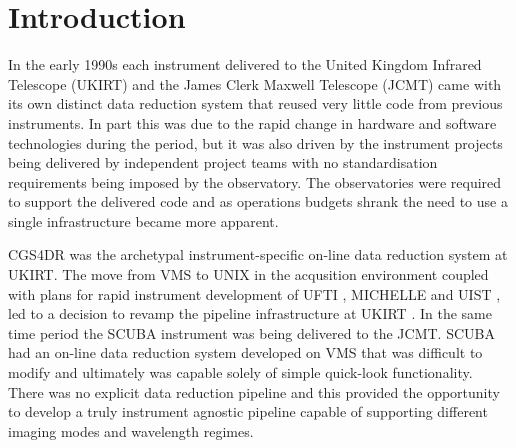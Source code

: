 \documentclass[final,authoryear,5p,times,twocolumn]{elsarticle}
\begin{document}

\newcommand{\mnras}{MNRAS}
\newcommand{\aap}{A\&A}
\newcommand{\aaps}{A\&AS}
\newcommand{\pasp}{PASP}
\newcommand{\apj}{ApJ}
\newcommand{\apjs}{ApJS}
\newcommand{\qjras}{QJRAS}
\newcommand{\an}{Astron.\ Nach.}
\newcommand{\ijimw}{Int.\ J.\ Infrared \& Millimeter Waves}
\newcommand{\procspie}{Proc.\ SPIE}
\newcommand{\aspconf}{ASP Conf. Ser.}


\newcommand{\recipe}{\emph{Recipe}}
\newcommand{\recipes}{\emph{Recipes}}
\newcommand{\primitive}{\emph{Primitive}}
\newcommand{\primitives}{\emph{Primitives}}
\newcommand{\Frame}{\emph{Frame}}
\newcommand{\Group}{\emph{Group}}
\newcommand{\Index}{\emph{index}}

\newcommand{\ascl}[1]{\href{http://www.ascl.net/#1}{ascl:#1}}


\section{Introduction}

In the early 1990s each instrument delivered to the United Kingdom
Infrared Telescope (UKIRT) and the James Clerk Maxwell Telescope (JCMT) came
with its own distinct data reduction system that reused very little
code from previous instruments. In part this was due to the rapid
change in hardware and software technologies during the period, but it
was also driven by the instrument projects being delivered
by independent project teams with no standardisation requirements
being imposed by the observatory. The observatories were required to
support the delivered code and as operations budgets shrank the need
to use a single infrastructure became more apparent.

CGS4DR
\citep[][\ascl{1406.013}]{1992ASPC...25..479S,1996ASPC...87..223D} was
the archetypal instrument-specific on-line data reduction system at
UKIRT. The move from VMS to UNIX in the acqusition environment coupled
with plans for rapid instrument development of UFTI
\citep{2003SPIE.4841..901R}, MICHELLE \citep{1993ASPC...41..401G} and
UIST \citep{2004SPIE.5492.1160R}, led to a decision to revamp the
pipeline infrastructure at UKIRT \citep{1998ASPC..145..196E}. In the
same time period the SCUBA instrument \citep{1999MNRAS.303..659H} was
being delivered to the JCMT. SCUBA had an on-line data reduction
system developed on VMS that was difficult to modify and ultimately
was capable solely of simple quick-look functionality. There was no explicit
data reduction pipeline and this provided the opportunity to develop a
truly instrument agnostic pipeline capable of supporting different
imaging modes and wavelength regimes.
\end{document}
